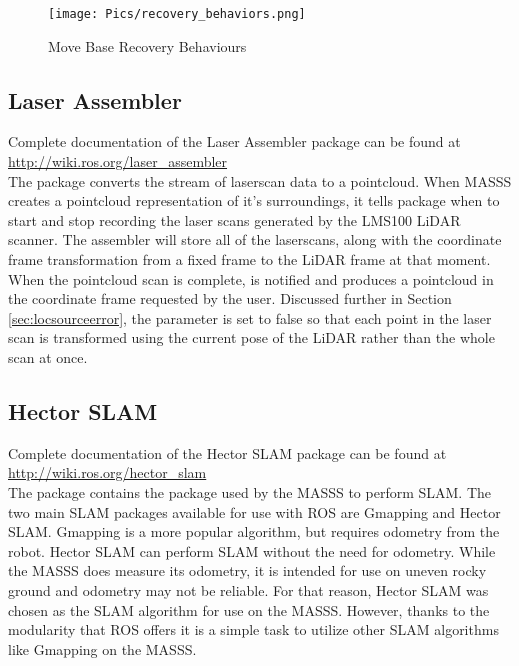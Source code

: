 \begin{figure}[H]
    \centering
    \texttt{[image: Pics/recovery\_behaviors.png]}
    \caption{Move Base Recovery Behaviours \cite{rosmovebase}}
    \label{fig:recovery}
\end{figure}

\subsection{Laser Assembler}


Complete documentation of the Laser Assembler package can be found at \url{http://wiki.ros.org/laser_assembler}\\

The  package converts the stream of laserscan data to a pointcloud. When MASSS creates a pointcloud representation of it's surroundings, it tells  package when to start and stop recording the laser scans generated by the LMS100 LiDAR scanner. The assembler will store all of the laserscans, along with the coordinate frame transformation from a fixed frame to the LiDAR frame at that moment. When the pointcloud scan is complete,  is notified and produces a pointcloud in the coordinate frame requested by the user. Discussed further in Section \ref{sec:locsourceerror}, the parameter  is set to false so that each point in the laser scan is transformed using the current pose of the LiDAR rather than the whole scan at once.\\

\subsection{Hector SLAM}

Complete documentation of the Hector SLAM package can be found at \url{http://wiki.ros.org/hector_slam}\\

The  package contains the  package used by the MASSS to perform SLAM. The two main SLAM packages available for use with ROS are Gmapping and Hector SLAM. Gmapping is a more popular algorithm, but requires odometry from the robot. Hector SLAM can perform SLAM without the need for odometry. While the MASSS does measure its odometry, it is intended for use on uneven rocky ground and odometry may not be reliable. For that reason, Hector SLAM was chosen as the SLAM algorithm for use on the MASSS. However, thanks to the modularity that ROS offers it is a simple task to utilize other SLAM algorithms like Gmapping on the MASSS.\\

